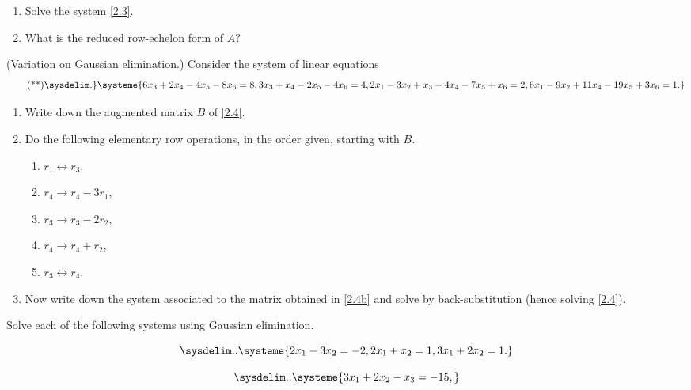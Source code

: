 \documentclass[english,12pt,a4paper]{scrartcl}
\newenvironment{modenumerate}
  {\enumerate\setupmodenumerate}
  {\endenumerate}
\newif\ifmoditem
\newcommand{\setupmodenumerate}{%
  \global\moditemfalse
  \let\origmakelabel\makelabel
  \def\moditem##1{\global\moditemtrue\def\mesymbol{##1}\item}%
  \def\makelabel##1{%
  \origmakelabel{##1\ifmoditem\rlap{\mesymbol}\fi\enspace}%
\global\moditemfalse}%
}
\begin{document}
\begin{modenumerate}
\begin{enumerate}[label=(\alph*)]
      \item Solve the system \eqref{2.3}.
      \item What is the reduced row-echelon form of $A$?
    \end{enumerate}
  \moditem{*} (Variation on Gaussian elimination.) Consider the system of 
  linear equations
    \begin{equation} \label{2.4} \tag{**}
      \sysdelim.\}\systeme{
        6x_3 + 2x_4 - 4x_5 - 8x_6 = 8,
        3x_3 + x_4 - 2x_5 - 4x_6 = 4,
        2x_1 - 3x_2 + x_3 + 4x_4 - 7x_5 + x_6 = 2,
        6x_1 - 9x_2 + 11x_4 - 19x_5 + 3x_6 = 1.
      }
    \end{equation}
    \begin{enumerate}[label=(\alph*), ref=(\alph*)]
      \item  Write down the augmented matrix $B$ of \eqref{2.4}.
      \item \label{2.4b} Do the following elementary row operations, in the 
        order given, starting with $B$.
        \begin{multicols}{3}[\setlength{\columnseprule}{0pt}]
          \begin{enumerate}[label=(\roman*)]
            \item $r_1 \leftrightarrow r_3$,
            \item $r_4 \to r_4 - 3r_1$,
            \item $r_3 \to r_3 - 2r_2$,
            \item $r_4 \to r_4 + r_2$,
            \item $r_3 \leftrightarrow r_4$.
          \end{enumerate}
        \end{multicols}
      \item Now write down the system associated to the matrix obtained in 
        \ref{2.4b} and solve by back-substitution (hence solving 
        \eqref{2.4}).
    \end{enumerate}
  \item Solve each of the following systems using Gaussian elimination.
    \begin{multicols}{2}[\setlength{\columnseprule}{0pt}]
      \begin{modenumerate}
        \moditem{*}
          \[
            \sysdelim..\systeme{
              2x_1 - 3x_2 = -2,
              2x_1 + x_2 = 1,
              3x_1 + 2x_2 = 1.
            }
          \]
        \item
          \[
            \sysdelim..\systeme{
              3x_1 + 2x_2 - x_3 = -15,
}\]
\end{modenumerate}
\end{multicols}
\end{modenumerate}
\end{document}
